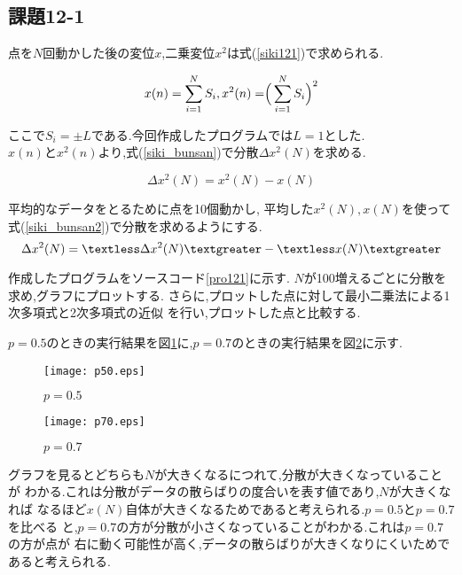 \documentclass[a4j]{jsarticle}
\begin{document}
\subsection{課題12-1}
点を$N$回動かした後の変位$x$,二乗変位$x^2$は式(\ref{siki121})で求められる.

\begin{equation}
x(n)=\sum_{i=1}^{N} S_i,x^2(n)=\Bigr(\sum_{i=1}^{N} S_i\Bigl)^2
\label{siki121}
\end{equation}

ここで$S_i = \pm L$である.今回作成したプログラムでは$L=1$とした.
$x(n)とx^2(n)$より,式(\ref{siki_bunsan})で分散$\Delta x^2(N)$を求める.

\begin{equation}
 \Delta x^2(N) = x^2(N) - x(N)
\label{siki_bunsan}
\end{equation}

平均的なデータをとるために点を10個動かし,
平均した$x^2(N),x(N)$を使って式(\ref{siki_bunsan2})で分散を求めるようにする.
\begin{equation}
 \Delta x^2(N) = \textless\Delta x^2(N)\textgreater - \textless x(N)\textgreater
  \label{siki_bunsan2}
\end{equation}

作成したプログラムをソースコード\ref{pro121}に示す.
$N$が100増えるごとに分散を求め,グラフにプロットする.
さらに,プロットした点に対して最小二乗法による1次多項式と2次多項式の近似
を行い,プロットした点と比較する.



$p=0.5$のときの実行結果を図\ref{p50}に,$p=0.7$のときの実行結果を図\ref{p70}に示す.
\begin{figure}[htbp]
 \centering
 \texttt{[image: p50.eps]}
 \caption{$p=0.5$}
 \label{p50}
\end{figure}

\begin{figure}[htbp]
 \centering
 \texttt{[image: p70.eps]}
 \caption{$p=0.7$}
 \label{p70}
\end{figure}

グラフを見るとどちらも$N$が大きくなるにつれて,分散が大きくなっていることが
わかる.これは分散がデータの散らばりの度合いを表す値であり,$N$が大きくなれば
なるほど$x(N)$自体が大きくなるためであると考えられる.$p=0.5$と$p=0.7$を比べる
と,$p=0.7$の方が分散が小さくなっていることがわかる.これは$p=0.7$の方が点が
右に動く可能性が高く,データの散らばりが大きくなりにくいためであると考えられる.
\end{document}

